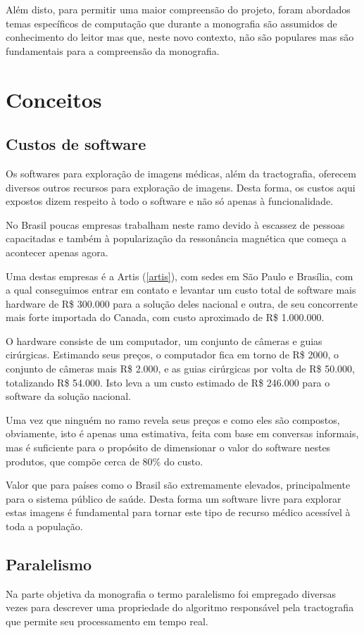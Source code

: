 \documentclass[a4paper,11pt]{report}
\begin{document}
Além disto, para permitir uma maior compreensão do projeto, foram abordados temas específicos de computação que durante a monografia são assumidos de conhecimento do leitor mas que, neste novo contexto, não são populares mas são fundamentais para a compreensão da monografia.

\chapter{Conceitos}
  \section{Custos de software}
  Os softwares para exploração de imagens médicas, além da tractografia, oferecem diversos outros recursos para exploração de imagens. Desta forma, os custos aqui expostos dizem respeito à todo o software e não só apenas à funcionalidade.
  
  No Brasil poucas empresas trabalham neste ramo devido à escassez de pessoas capacitadas e também à popularização da ressonância magnética que começa a acontecer apenas agora.
  
  Uma destas empresas é a Artis (\ref{artis}), com sedes em São Paulo e Brasília, com a qual conseguimos entrar em contato e levantar um custo total de software mais hardware de R\$ 300.000 para a solução deles nacional e outra, de seu concorrente mais forte importada do Canada, com custo aproximado de R\$ 1.000.000.
  
  O hardware consiste de um computador, um conjunto de câmeras e guias cirúrgicas. Estimando seus preços, o computador fica em torno de R\$ 2000, o conjunto de câmeras mais R\$ 2.000, e as guias cirúrgicas por volta de R\$ 50.000, totalizando R\$ 54.000. Isto leva a um custo estimado de R\$ 246.000 para o software da solução nacional.
  
  Uma vez que ninguém no ramo revela seus preços e como eles são compostos, obviamente, isto é apenas uma estimativa, feita com base em conversas informais, mas é suficiente para o propósito de dimensionar o valor do software nestes produtos, que compõe cerca de 80\% do custo.
  
  Valor que para países como o Brasil são extremamente elevados, principalmente para o sistema público de saúde. Desta forma um software livre para explorar estas imagens é fundamental para tornar este tipo de recurso médico acessível à toda a população.
  
  \section{Paralelismo}
    Na parte objetiva da monografia o termo paralelismo foi empregado diversas vezes para descrever uma propriedade do algoritmo responsável pela tractografia que permite seu processamento em tempo real.
    
\end{document}
